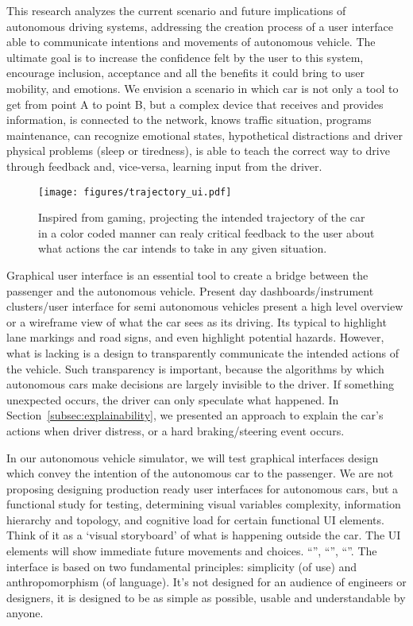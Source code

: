 This research analyzes the current scenario and future implications of autonomous driving systems, addressing the creation process of a user interface able to communicate intentions and movements of autonomous vehicle.
The ultimate goal is to increase the confidence felt by the user to this system, encourage inclusion, acceptance and all the benefits it could bring to user mobility, and emotions.
We envision a scenario in which car is not only a tool to get from point A to point B, but a complex device that receives and provides information, is connected to the network, knows traffic situation, programs maintenance, can recognize emotional states, hypothetical distractions and driver physical problems (sleep or tiredness), is able to teach the correct way to drive through feedback and, vice-versa, learning input from the driver.
\begin{wrapfigure}{r}{0.5\textwidth}
  \begin{center}
    \texttt{[image: figures/trajectory\_ui.pdf]}
  \end{center}
  \caption{Inspired from gaming, projecting the intended trajectory of the car in a color coded manner can realy critical feedback to the user about what actions the car intends to take in any given situation.}
  \label{fig:trajectory}
\end{wrapfigure}
Graphical user interface is an essential tool to create a bridge between the passenger and the autonomous vehicle. 
Present day dashboards/instrument clusters/user interface for semi autonomous vehicles present a high level overview or a wireframe view of what the car sees as its driving. Its typical to highlight lane markings and road signs, and even highlight potential hazards.
However, what is lacking is a design to transparently communicate the intended actions of the vehicle. 
Such transparency is important, because the algorithms by which autonomous cars make decisions are largely invisible to the driver.
If something unexpected occurs, the driver can only speculate what happened. In Section~\ref{subsec:explainability}, we presented an approach to explain the car's actions when driver distress, or a hard braking/steering event occurs. 

In our autonomous vehicle simulator, we will test graphical interfaces design which convey the intention of the autonomous car to the passenger. We are not proposing designing production ready user interfaces for autonomous cars, but a functional study for testing, determining visual variables complexity, information hierarchy and topology, and cognitive load for certain functional UI elements. 
Think of it as a `visual storyboard' of what is happening outside the car. The UI elements will show immediate future movements and choices. ``'', ``'', ``''.
The interface is based on two fundamental principles: simplicity (of use) and anthropomorphism (of language). 
It's not designed for an audience of engineers or designers, it is designed to be as simple as possible, usable and understandable by anyone.

